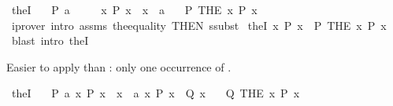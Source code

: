 \begin{isabellebody}
\endisatagproof
{\isafoldproof}%
%
\isadelimproof
\isanewline
%
\endisadelimproof
\isanewline
{}\isamarkupfalse%
\ theI{\isacharcolon}{\kern0pt}\isanewline
\ \ \ {\isachardoublequoteopen}P\ a{\isachardoublequoteclose}\isanewline
\ \ \ \ \ {\isachardoublequoteopen}{\isasymAnd}x{\isachardot}{\kern0pt}\ P\ x\ {\isasymLongrightarrow}\ x\ {\isacharequal}{\kern0pt}\ a{\isachardoublequoteclose}\isanewline
\ \ \ {\isachardoublequoteopen}P\ {\isacharparenleft}{\kern0pt}THE\ x{\isachardot}{\kern0pt}\ P\ x{\isacharparenright}{\kern0pt}{\isachardoublequoteclose}\isanewline
%
\isadelimproof
\ \ %
\endisadelimproof
%
\isatagproof
{}\isamarkupfalse%
\ {\isacharparenleft}{\kern0pt}iprover\ intro{\isacharcolon}{\kern0pt}\ assms\ the{\isacharunderscore}{\kern0pt}equality\ {\isacharbrackleft}{\kern0pt}THEN\ ssubst{\isacharbrackright}{\kern0pt}{\isacharparenright}{\kern0pt}%
\endisatagproof
{\isafoldproof}%
%
\isadelimproof
\isanewline
%
\endisadelimproof
\isanewline
{}\isamarkupfalse%
\ theI{\isacharprime}{\kern0pt}{\isacharcolon}{\kern0pt}\ {\isachardoublequoteopen}{\isasymexists}{\isacharbang}{\kern0pt}x{\isachardot}{\kern0pt}\ P\ x\ {\isasymLongrightarrow}\ P\ {\isacharparenleft}{\kern0pt}THE\ x{\isachardot}{\kern0pt}\ P\ x{\isacharparenright}{\kern0pt}{\isachardoublequoteclose}\isanewline
%
\isadelimproof
\ \ %
\endisadelimproof
%
\isatagproof
{}\isamarkupfalse%
\ {\isacharparenleft}{\kern0pt}blast\ intro{\isacharcolon}{\kern0pt}\ theI{\isacharparenright}{\kern0pt}%
\endisatagproof
{\isafoldproof}%
%
\isadelimproof
%
\endisadelimproof
%
\begin{isamarkuptext}%
Easier to apply than : only one occurrence of .%
\end{isamarkuptext}\isamarkuptrue%
\isamarkupfalse%
\ theI{}{\isacharcolon}{\kern0pt}\isanewline
\ \ \ {\isachardoublequoteopen}P\ a{\isachardoublequoteclose}\ {\isachardoublequoteopen}{\isasymAnd}x{\isachardot}{\kern0pt}\ P\ x\ {\isasymLongrightarrow}\ x\ {\isacharequal}{\kern0pt}\ a{\isachardoublequoteclose}\ {\isachardoublequoteopen}{\isasymAnd}x{\isachardot}{\kern0pt}\ P\ x\ {\isasymLongrightarrow}\ Q\ x{\isachardoublequoteclose}\isanewline
\ \ \ {\isachardoublequoteopen}Q\ {\isacharparenleft}{\kern0pt}THE\ x{\isachardot}{\kern0pt}\ P\ x{\isacharparenright}{\kern0pt}{\isachardoublequoteclose}\isanewline
%
\isadelimproof
\ \ %
\endisadelimproof
%
\isatagproof
{}\isamarkupfalse%

\end{isabellebody}
